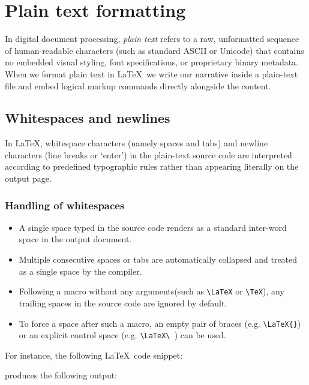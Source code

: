 \section{Plain text formatting}
	In digital document processing, \emph{plain text} refers to a raw, unformatted sequence of human-readable characters (such as standard ASCII or Unicode) that contains no embedded visual styling, font specifications, or proprietary binary metadata. When we format plain text in \LaTeX\, we write our narrative inside a plain-text file and embed logical markup commands directly alongside the content.
	
	\subsection{Whitespaces and newlines}
		In \LaTeX, whitespace characters (namely spaces and tabs) and newline characters (line breaks or `enter') in the plain-text source code are interpreted according to predefined typographic rules rather than appearing literally on the output page.
		
		\subsubsection{Handling of whitespaces}
			\begin{itemize}
				\item A single space typed in the source code renders as a standard inter-word space in the output document.
				\item Multiple consecutive spaces or tabs are automatically collapsed and treated as a single space by the compiler.
				\item Following a macro without any arguments(such as \lstinline|\LaTeX| or \lstinline|\TeX|), any trailing spaces in the source code are ignored by default.
				\item To force a space after such a macro, an empty pair of braces (e.g. \lstinline|\LaTeX{}|) or an explicit control space (e.g. \lstinline|\LaTeX\ |) can be used.
			\end{itemize}
			
			For instance, the following \LaTeX\ code snippet:

			produces the following output:
		
